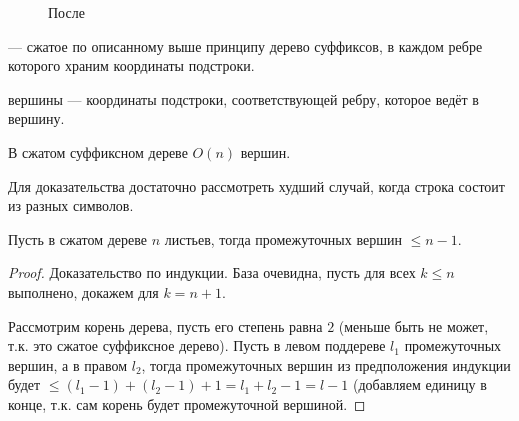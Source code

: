 \begin{figure}[H]
  \caption*{После}
  \begin{center}
  \end{center}
\end{figure}

\begin{definition}
   --- сжатое по описанному выше принципу дерево суффиксов, в каждом
  ребре которого храним координаты подстроки.
\end{definition}

\begin{definition}
  \label{pathway}
   вершины --- координаты подстроки, соответствующей ребру, которое ведёт в вершину. 
\end{definition}


\begin{remark}
  В сжатом суффиксном дереве $O(n)$ вершин.
\end{remark}
Для доказательства достаточно рассмотреть худший случай, когда строка состоит из разных символов.

\begin{remark}
  Пусть в сжатом дереве $n$ листьев, тогда промежуточных вершин $\leq n - 1$.
\end{remark}

\begin{proof}
  Доказательство по индукции. База очевидна, пусть для всех $k \leq n$ выполнено, докажем для $k = n + 1$.

  Рассмотрим корень дерева, пусть его степень равна $2$ (меньше быть не может, т.к. это сжатое
  суффиксное дерево). Пусть в левом поддереве $l_1$ промежуточных вершин,
  а в правом $l_2$, тогда промежуточных вершин из предположения индукции 
  будет $\leq (l_1 - 1) + (l_2 - 1) + 1 = l_1 + l_2 - 1 = l - 1$ (добавляем единицу в конце, т.к. сам корень
  будет промежуточной вершиной.
\end{proof}

